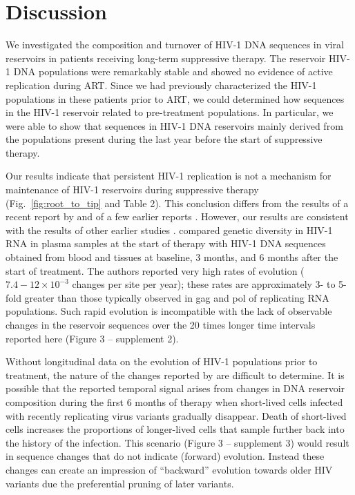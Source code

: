 \documentclass[aps,rmp,onecolumn,linenumbers]{revtex4-1}
\newcommand{\FIG}[1]{Fig.~\ref{fig:#1}}
\begin{document}
\section*{Discussion}
We investigated the composition and turnover of HIV-1 DNA sequences in viral reservoirs in patients receiving long-term suppressive therapy. The reservoir HIV-1 DNA populations were remarkably stable and showed no evidence of active replication during ART. Since we had previously characterized the HIV-1 populations in these patients prior to ART, we could determined how sequences in the HIV-1 reservoir related to pre-treatment populations. In particular, we were able to show that sequences in HIV-1 DNA reservoirs mainly derived from the populations present during the last year before the start of suppressive therapy.

Our results indicate that persistent HIV-1 replication is not a mechanism for maintenance of HIV-1 reservoirs during suppressive therapy (\FIG{root_to_tip} and Table 2). This conclusion differs from the results of a recent report by \citet{lorenzo-redondo_persistent_2016} and of a few earlier reports \cite{yukl_effect_2010,buzon_hiv-1_2010}. However, our results are consistent with the results of other earlier studies \cite{stockenstrom_longitudinal_2015,besson_hiv-1_2014,josefsson_hiv-1_2013,kearney_lack_2014,gunthard_evolution_1999,evering_absence_2012,kieffer_absence_2004}. \citet{lorenzo-redondo_persistent_2016} compared genetic diversity in HIV-1 RNA in plasma samples at the start of therapy with HIV-1 DNA sequences obtained from blood and tissues at baseline, 3 months, and 6 months after the start of treatment. The authors reported very high rates of evolution ($7.4-12\times 10^{-3}$ changes per site per year); these rates are approximately 3- to 5-fold greater than those typically observed in gag and pol of replicating RNA populations. 
Such rapid evolution is incompatible with the lack of observable changes in the reservoir sequences over the 20 times longer time intervals reported here (Figure 3 -- supplement 2).

Without longitudinal data on the evolution of HIV-1 populations prior to treatment, the nature of the changes reported by \citet{lorenzo-redondo_persistent_2016} are difficult to determine. It is possible that the reported temporal signal arises from changes in DNA reservoir composition during the first 6 months of therapy when short-lived cells infected with recently replicating virus variants gradually disappear. Death of short-lived cells increases the proportions of longer-lived cells that sample further back into the history of the infection. This scenario (Figure 3 -- supplement 3) would result in sequence changes that do not indicate (forward) evolution. Instead these changes can create an impression of ``backward'' evolution towards older HIV variants due the preferential pruning of later variants. 
\end{document}

